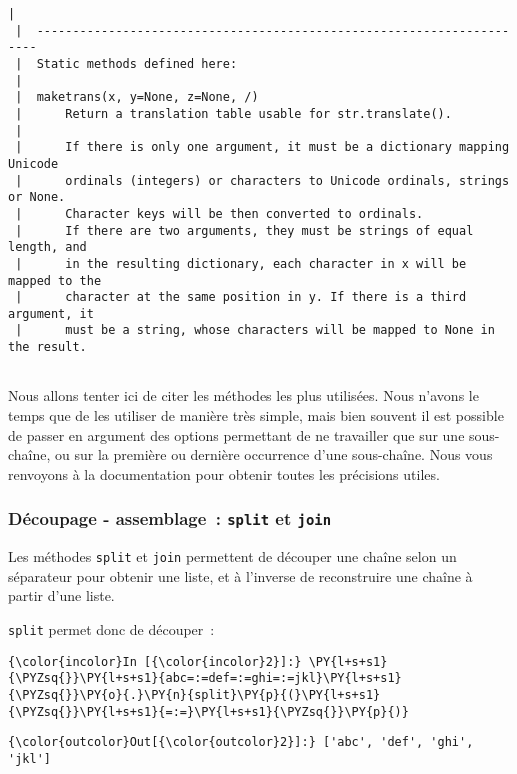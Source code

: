 \begin{Verbatim}[commandchars=\\\{\}]
 |  
 |  ----------------------------------------------------------------------
 |  Static methods defined here:
 |  
 |  maketrans(x, y=None, z=None, /)
 |      Return a translation table usable for str.translate().
 |      
 |      If there is only one argument, it must be a dictionary mapping Unicode
 |      ordinals (integers) or characters to Unicode ordinals, strings or None.
 |      Character keys will be then converted to ordinals.
 |      If there are two arguments, they must be strings of equal length, and
 |      in the resulting dictionary, each character in x will be mapped to the
 |      character at the same position in y. If there is a third argument, it
 |      must be a string, whose characters will be mapped to None in the result.


    \end{Verbatim}
\newpage
    Nous allons tenter ici de citer les méthodes les plus utilisées. Nous
n'avons le temps que de les utiliser de manière très simple, mais bien
souvent il est possible de passer en argument des options permettant de
ne travailler que sur une sous-chaîne, ou sur la première ou dernière
occurrence d'une sous-chaîne. Nous vous renvoyons à la documentation
pour obtenir toutes les précisions utiles.

    \hypertarget{duxe9coupage---assemblage-split-et-join}{%
\subsubsection{\texorpdfstring{Découpage - assemblage~: \texttt{split}
et
\texttt{join}}{Découpage - assemblage~: split et join}}\label{duxe9coupage---assemblage-split-et-join}}

    Les méthodes \texttt{split} et \texttt{join} permettent de découper une
chaîne selon un séparateur pour obtenir une liste, et à l'inverse de
reconstruire une chaîne à partir d'une liste.

    \texttt{split} permet donc de découper~:

    \begin{Verbatim}[commandchars=\\\{\}]
{\color{incolor}In [{\color{incolor}2}]:} \PY{l+s+s1}{\PYZsq{}}\PY{l+s+s1}{abc=:=def=:=ghi=:=jkl}\PY{l+s+s1}{\PYZsq{}}\PY{o}{.}\PY{n}{split}\PY{p}{(}\PY{l+s+s1}{\PYZsq{}}\PY{l+s+s1}{=:=}\PY{l+s+s1}{\PYZsq{}}\PY{p}{)}
\end{Verbatim}


\begin{Verbatim}[commandchars=\\\{\}]
{\color{outcolor}Out[{\color{outcolor}2}]:} ['abc', 'def', 'ghi', 'jkl']
\end{Verbatim}
            
